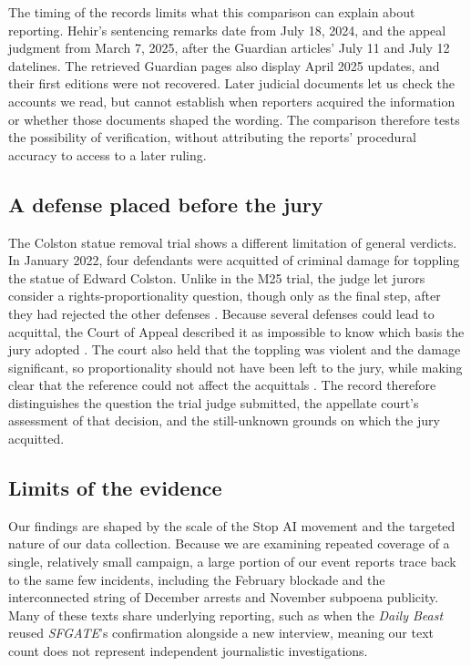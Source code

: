 \documentclass[11pt]{article}
\begin{document}
The timing of the records limits what this comparison can explain about reporting. Hehir's sentencing remarks date from July 18, 2024, and the appeal judgment from March 7, 2025, after the Guardian articles' July 11 and July 12 datelines. The retrieved Guardian pages also display April 2025 updates, and their first editions were not recovered. Later judicial documents let us check the accounts we read, but cannot establish when reporters acquired the information or whether those documents shaped the wording. The comparison therefore tests the possibility of verification, without attributing the reports' procedural accuracy to access to a later ruling.

\subsection{A defense placed before the jury}
\label{sec:colston}
The Colston statue removal trial shows a different limitation of general verdicts. In January 2022, four defendants were acquitted of criminal damage for toppling the statue of Edward Colston. Unlike in the M25 trial, the judge let jurors consider a rights-proportionality question, though only as the final step, after they had rejected the other defenses \citep[paras.~14--15]{colston}. Because several defenses could lead to acquittal, the Court of Appeal described it as impossible to know which basis the jury adopted \citep[para.~2]{colston}. The court also held that the toppling was violent and the damage significant, so proportionality should not have been left to the jury, while making clear that the reference could not affect the acquittals \citep[paras.~2, 123]{colston}. The record therefore distinguishes the question the trial judge submitted, the appellate court's assessment of that decision, and the still-unknown grounds on which the jury acquitted.

\FloatBarrier
\subsection{Limits of the evidence}
Our findings are shaped by the scale of the Stop AI movement and the targeted nature of our data collection. Because we are examining repeated coverage of a single, relatively small campaign, a large portion of our event reports trace back to the same few incidents, including the February blockade and the interconnected string of December arrests and November subpoena publicity. Many of these texts share underlying reporting, such as when the \textit{Daily Beast} reused \textit{SFGATE}'s confirmation alongside a new interview, meaning our text count does not represent independent journalistic investigations.
\end{document}
